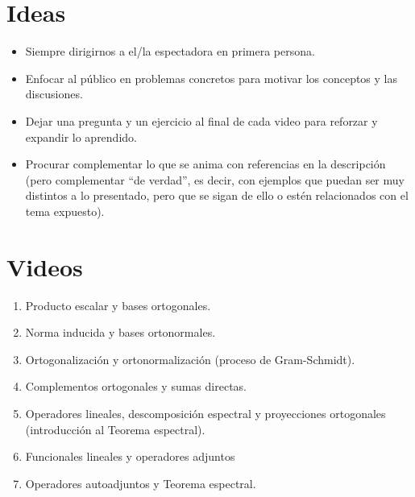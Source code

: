 \documentclass[12pt,dvipsnames]{article}
\numberwithin{equation}{section}
\begin{document}
\section{Ideas}

\begin{itemize}
    \item Siempre dirigirnos a el/la espectadora en primera persona.
    \item Enfocar al público en problemas concretos para motivar los conceptos y las discusiones.
    \item Dejar una pregunta y un ejercicio al final de cada video para reforzar y expandir lo aprendido.
    \item Procurar complementar lo que se anima con referencias en la descripción (pero complementar ``de verdad'', es decir, con ejemplos que puedan ser muy distintos a lo presentado, pero que se sigan de ello o estén relacionados con el tema expuesto).
\end{itemize}

\section{Videos}

\begin{enumerate}
    \item Producto escalar y bases ortogonales.
    \item Norma inducida y bases ortonormales.
    \item Ortogonalización y ortonormalización (proceso de Gram-Schmidt).
    \item Complementos ortogonales y sumas directas.
    \item Operadores lineales, descomposición espectral y proyecciones ortogonales (introducción al Teorema espectral).
    \item Funcionales lineales y operadores adjuntos
    \item Operadores autoadjuntos y Teorema espectral.
\end{enumerate}
\end{document}
